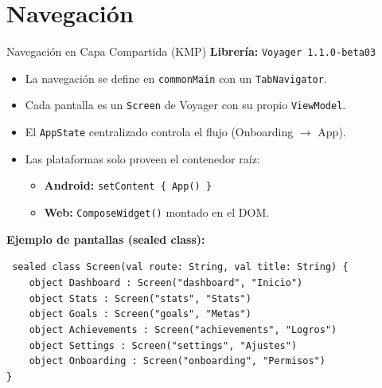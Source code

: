 \documentclass[aspectratio=169]{beamer}
\begin{document}
\section{Navegación}
\begin{frame}{Navegación en Capa Compartida (KMP)}
  \textbf{Librería:} \texttt{Voyager 1.1.0-beta03}

  \vspace{0.3cm}
  \begin{itemize}
    \item La navegación se define en \texttt{commonMain} con un \texttt{TabNavigator}.
    \item Cada pantalla es un \texttt{Screen} de Voyager con su propio \texttt{ViewModel}.
    \item El \texttt{AppState} centralizado controla el flujo (Onboarding $\rightarrow$ App).
    \item Las plataformas solo proveen el contenedor raíz:
      \begin{itemize}
        \item \textbf{Android:} \texttt{setContent \{ App() \}}
        \item \textbf{Web:} \texttt{ComposeWidget()} montado en el DOM.
      \end{itemize}
  \end{itemize}

  \vspace{0.3cm}
  \textbf{Ejemplo de pantallas (sealed class):}
  \begin{center}
  \texttt{\tiny
  sealed class Screen(val route: String, val title: String) \{\\
  \ \ \ \ object Dashboard : Screen("dashboard", "Inicio")\\
  \ \ \ \ object Stats : Screen("stats", "Stats")\\
  \ \ \ \ object Goals : Screen("goals", "Metas")\\
  \ \ \ \ object Achievements : Screen("achievements", "Logros")\\
  \ \ \ \ object Settings : Screen("settings", "Ajustes")\\
  \ \ \ \ object Onboarding : Screen("onboarding", "Permisos")\\
  \}
  }
  \end{center}
\end{frame}

\end{document}
